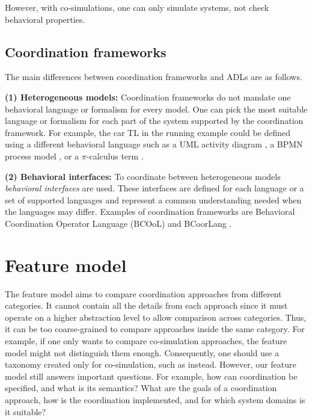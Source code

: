 \documentclass[runningheads]{llncs}
\begin{document}
However, with co-simulations, one can only simulate systems, not check behavioral properties.

\subsection{Coordination frameworks} \label{subsec:frameworks}

The main differences between coordination frameworks and ADLs are as follows.

\textbf{(1) Heterogeneous models:} Coordination frameworks do not mandate one behavioral language or formalism for every model.
One can pick the most suitable language or formalism for each part of the system supported by the coordination framework.
For example, the car TL in the running example could be defined using a different behavioral language such as a UML activity diagram \cite{objectmanagementgroupUnifiedModelingLanguage2017}, a BPMN process model \cite{objectmanagementgroupBusinessProcessModel2013}, or a $\pi$-calculus term \cite{milnerCommunicatingMobileSystems2010}.

\textbf{(2) Behavioral interfaces:} To coordinate between heterogeneous models \textit{behavioral interfaces} are used.
These interfaces are defined for each language or a set of supported languages and represent a common understanding needed when the languages may differ.
Examples of coordination frameworks are Behavioral Coordination Operator Language (BCOoL) \cite{varalarsenBCOolBehavioralCoordination2016,varalarsenBehavioralCoordinationOperator2015} and BCoorLang \cite{krauterBehavioralConsistencyMultimodeling2023}.


\section{Feature model} \label{sec:features}
The feature model aims to compare coordination approaches from different categories.
It cannot contain all the details from each approach since it must operate on a higher abstraction level to allow comparison across categories.
Thus, it can be too coarse-grained to compare approaches inside the same category.
For example, if one only wants to compare co-simulation approaches, the feature model might not distinguish them enough.
Consequently, one should use a taxonomy created only for co-simulation, such as \cite{gomesCoSimulationSurvey2019} instead.
However, our feature model still answers important questions.
For example, how can coordination be specified, and what is its semantics?
What are the goals of a coordination approach, how is the coordination implemented, and for which system domains is it suitable?
\end{document}
